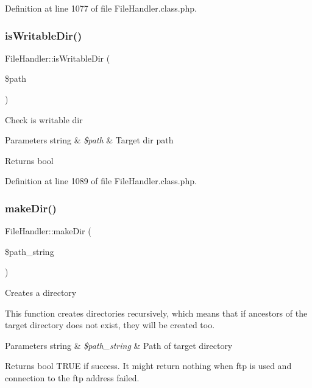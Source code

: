 Definition at line 1077 of file File\+Handler.\+class.\+php.

\hypertarget{classFileHandler_a9494e34a28f27b6a1ab2e032aada2bbb}{}\label{classFileHandler_a9494e34a28f27b6a1ab2e032aada2bbb} 
\subsubsection{\texorpdfstring{is\+Writable\+Dir()}{isWritableDir()}}
{\footnotesize\ttfamily File\+Handler\+::is\+Writable\+Dir (\begin{DoxyParamCaption}\item[{}]{\$path }\end{DoxyParamCaption})}

Check is writable dir


\begin{DoxyParams}[1]{Parameters}
string & {\em \$path} & Target dir path \\
\hline
\end{DoxyParams}
\begin{DoxyReturn}{Returns}
bool 
\end{DoxyReturn}


Definition at line 1089 of file File\+Handler.\+class.\+php.

\hypertarget{classFileHandler_a9c2502d10c34a3996f1d6927624a7824}{}\label{classFileHandler_a9c2502d10c34a3996f1d6927624a7824} 
\subsubsection{\texorpdfstring{make\+Dir()}{makeDir()}}
{\footnotesize\ttfamily File\+Handler\+::make\+Dir (\begin{DoxyParamCaption}\item[{}]{\$path\+\_\+string }\end{DoxyParamCaption})}

Creates a directory

This function creates directories recursively, which means that if ancestors of the target directory does not exist, they will be created too.


\begin{DoxyParams}[1]{Parameters}
string & {\em \$path\+\_\+string} & Path of target directory \\
\hline
\end{DoxyParams}
\begin{DoxyReturn}{Returns}
bool T\+R\+UE if success. It might return nothing when ftp is used and connection to the ftp address failed. 
\end{DoxyReturn}


